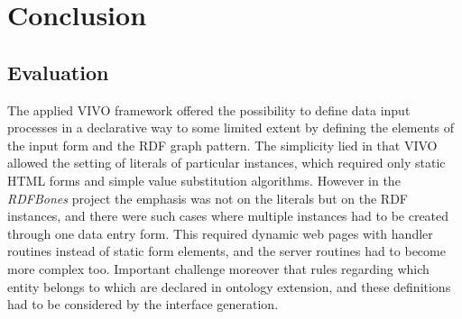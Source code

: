 

\chapter{Conclusion}

\section{Evaluation}

The applied VIVO framework offered the possibility to define data input processes in a declarative way to some limited extent by defining the elements of the input form and the RDF graph pattern. The simplicity lied in that VIVO allowed the setting of literals of particular instances, which required only static HTML forms and simple value substitution algorithms. However in the \textit{RDFBones} project the emphasis was not on the literals but on the RDF instances, and there were such cases where multiple instances had to be created through one data entry form. This required dynamic web pages with handler routines instead of static form elements, and the server routines had to become more complex too. Important challenge moreover that rules regarding which entity belongs to which are declared in ontology extension, and these definitions had to be considered by the interface generation.

